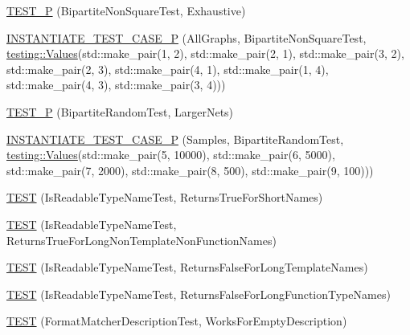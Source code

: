 \begin{DoxyCompactItemize}
\mbox{\hyperlink{namespacetesting_1_1gmock__matchers__test_a3ac913ed55a7ac2636ae7bfce04296e9}{T\+E\+S\+T\+\_\+P}} (Bipartite\+Non\+Square\+Test, Exhaustive)
\item 
\mbox{\hyperlink{namespacetesting_1_1gmock__matchers__test_a64ef722e930c3088ddea704ac20194b5}{I\+N\+S\+T\+A\+N\+T\+I\+A\+T\+E\+\_\+\+T\+E\+S\+T\+\_\+\+C\+A\+S\+E\+\_\+P}} (All\+Graphs, Bipartite\+Non\+Square\+Test, \mbox{\hyperlink{namespacetesting_abd3c87b40c2a0663691c9b617ed5fcc2}{testing\+::\+Values}}(std\+::make\+\_\+pair(1, 2), std\+::make\+\_\+pair(2, 1), std\+::make\+\_\+pair(3, 2), std\+::make\+\_\+pair(2, 3), std\+::make\+\_\+pair(4, 1), std\+::make\+\_\+pair(1, 4), std\+::make\+\_\+pair(4, 3), std\+::make\+\_\+pair(3, 4)))
\item 
\mbox{\hyperlink{namespacetesting_1_1gmock__matchers__test_ace6351a5a34b746491458140b06534ed}{T\+E\+S\+T\+\_\+P}} (Bipartite\+Random\+Test, Larger\+Nets)
\item 
\mbox{\hyperlink{namespacetesting_1_1gmock__matchers__test_a857f48ffb1fc6f5ce61aec79b5c94da8}{I\+N\+S\+T\+A\+N\+T\+I\+A\+T\+E\+\_\+\+T\+E\+S\+T\+\_\+\+C\+A\+S\+E\+\_\+P}} (Samples, Bipartite\+Random\+Test, \mbox{\hyperlink{namespacetesting_abd3c87b40c2a0663691c9b617ed5fcc2}{testing\+::\+Values}}(std\+::make\+\_\+pair(5, 10000), std\+::make\+\_\+pair(6, 5000), std\+::make\+\_\+pair(7, 2000), std\+::make\+\_\+pair(8, 500), std\+::make\+\_\+pair(9, 100)))
\item 
\mbox{\hyperlink{namespacetesting_1_1gmock__matchers__test_aef0bf5f855b1e75c63ec45408b5a23ba}{T\+E\+ST}} (Is\+Readable\+Type\+Name\+Test, Returns\+True\+For\+Short\+Names)
\item 
\mbox{\hyperlink{namespacetesting_1_1gmock__matchers__test_a839515535e3e75d4f80ba6ae8f7347ec}{T\+E\+ST}} (Is\+Readable\+Type\+Name\+Test, Returns\+True\+For\+Long\+Non\+Template\+Non\+Function\+Names)
\item 
\mbox{\hyperlink{namespacetesting_1_1gmock__matchers__test_ad1630d47de9f4fcdc00ab4962eaeea05}{T\+E\+ST}} (Is\+Readable\+Type\+Name\+Test, Returns\+False\+For\+Long\+Template\+Names)
\item 
\mbox{\hyperlink{namespacetesting_1_1gmock__matchers__test_a30516b1c70e14132d1d87ab08b96aa2f}{T\+E\+ST}} (Is\+Readable\+Type\+Name\+Test, Returns\+False\+For\+Long\+Function\+Type\+Names)
\item 
\mbox{\hyperlink{namespacetesting_1_1gmock__matchers__test_ae104f652fab7d1b3c3873f6987401481}{T\+E\+ST}} (Format\+Matcher\+Description\+Test, Works\+For\+Empty\+Description)

\end{DoxyCompactItemize}

